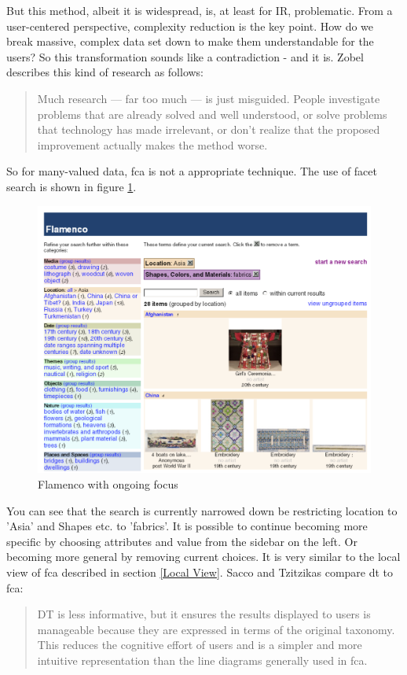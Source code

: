 \documentclass[11pt]{report}
\begin{document}
{{But this method, albeit it is widespread, is, at least for IR, problematic. From a user-centered perspective, complexity reduction is the key point. How do we break massive, complex data set down to make them understandable for the users? So this transformation sounds like a contradiction - and it is. Zobel describes this kind of research as follows:

\begin{quote}
Much research — far too much — is just misguided. People investigate problems that are already solved and well understood, or solve problems that technology has made irrelevant, or don’t realize that the proposed improvement actually makes the method worse.
\end{quote}

So for many-valued data, \acrshort{fca} is not a appropriate technique. The use of facet search is shown in figure \ref{figure:flamenco}. \\

\begin{figure}[!ht]
	\centering
	\includegraphics[width=\linewidth]{images/flamenco}
\caption{Flamenco with ongoing focus}
\label{figure:flamenco}
\end{figure}

You can see that the search is currently narrowed down be restricting location to 'Asia' and Shapes etc. to 'fabrics'. It is possible to continue becoming more specific by choosing attributes and value from the sidebar on the left. Or becoming more general by removing current choices. It is very similar to the local view of \acrshort{fca} described in section \ref{Local View}. Sacco and Tzitzikas \cite{Sacco2009} compare \acrshort{dt} to \acrshort{fca}:
\begin{quote}
DT is less informative, but it ensures the results displayed to users is manageable because they are expressed in terms of the original taxonomy. This reduces the cognitive effort of users and is a simpler and more intuitive representation than the line diagrams generally used in \acrshort{fca}.
\end{quote}

}}
\end{document}
